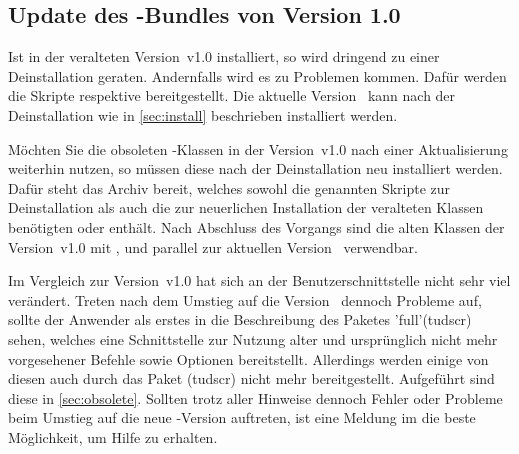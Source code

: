 \subsection{Update des \TUDScript-Bundles von Version 1.0}
\begin{Declaration*}{}
\begin{Declaration*}{}
\begin{Declaration*}{}
%
Ist \TUDScript in der veralteten Version~v1.0 installiert, so wird dringend zu 
einer Deinstallation geraten. Andernfalls wird es zu Problemen kommen. Dafür 
werden die Skripte 
respektive
bereitgestellt. Die aktuelle Version~\vTUDScript{} kann nach der Deinstallation 
wie in \autoref{sec:install} beschrieben installiert werden.

Möchten Sie die obsoleten \TUDScript-Klassen in der Version~v1.0 nach einer 
Aktualisierung weiterhin nutzen, so müssen diese nach der Deinstallation neu 
installiert werden. Dafür steht das Archiv 
%
{} bereit, welches sowohl die genannten 
Skripte zur Deinstallation als auch die zur neuerlichen Installation der 
veralteten Klassen benötigten  oder 
 enthält. Nach Abschluss des Vorgangs sind 
die alten Klassen der Version~v1.0 mit , 
 und  parallel zur aktuellen 
Version~\vTUDScript{} verwendbar.

Im Vergleich zur Version~v1.0 hat sich an der Benutzerschnittstelle nicht sehr 
viel verändert. Treten nach dem Umstieg auf die Version~\vTUDScript{} dennoch 
Probleme auf, sollte der Anwender als erstes in die Beschreibung des Paketes 
'full'(tudscr) sehen, welches eine Schnittstelle zur 
Nutzung alter und ursprünglich nicht mehr vorgesehener Befehle sowie Optionen 
bereitstellt. Allerdings werden einige von diesen auch durch das Paket 
(tudscr) nicht mehr bereitgestellt. Aufgeführt sind diese 
in \autoref{sec:obsolete}. Sollten trotz aller Hinweise dennoch Fehler oder 
Probleme beim Umstieg auf die neue \TUDScript-Version auftreten, ist eine 
Meldung im \Forum die beste Möglichkeit, um Hilfe zu erhalten.
\end{Declaration*}
\end{Declaration*}
\end{Declaration*}



